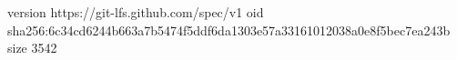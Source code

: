 version https://git-lfs.github.com/spec/v1
oid sha256:6c34cd6244b663a7b5474f5ddf6da1303e57a33161012038a0e8f5bec7ea243b
size 3542
